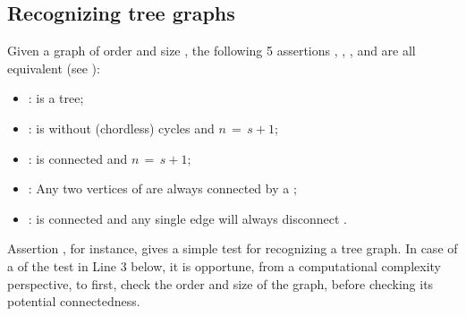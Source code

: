 \documentclass[a4paper,10pt,english]{sphinxhowto}
\begin{document}
\subsection{Recognizing tree graphs}
\label{\detokenize{tutorial:recognizing-tree-graphs}}
Given a graph  of order  and size , the following 5 assertions , , ,  and  are all equivalent (see ):
\begin{itemize}
\item {} 
:  is a tree;

\item {} 
:  is without (chordless) cycles and \(n \,=\, s + 1\);

\item {} 
:  is connected and \(n \,=\, s + 1\);

\item {} 
: Any two vertices of  are always connected by a ;

\item {} 
:  is connected and  any single edge will always disconnect .

\end{itemize}

Assertion , for instance, gives a simple test for recognizing a tree graph. In case of a  of the test in Line 3 below, it is opportune, from a computational complexity perspective, to first, check the order and size of the graph, before checking its potential connectedness.
\end{document}
